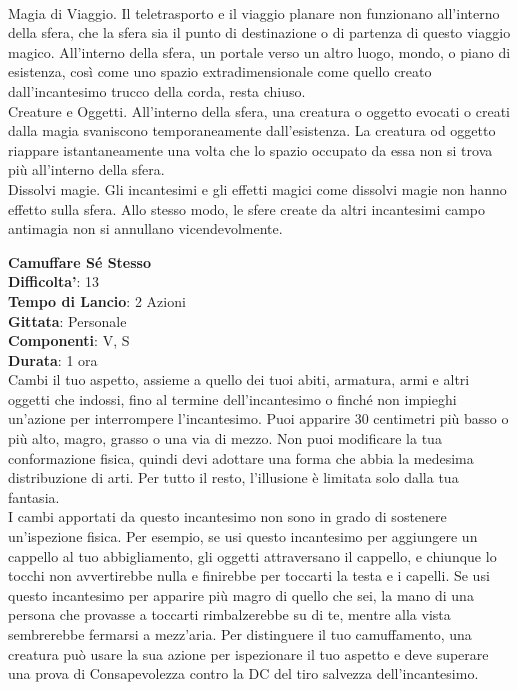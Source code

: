 \begin{multicols}{2}
\\Magia di Viaggio. Il teletrasporto e il viaggio planare non funzionano all’interno della sfera, che la sfera sia il punto di destinazione o di partenza di questo viaggio magico. All’interno della sfera, un portale verso un altro luogo, mondo, o piano di esistenza, così come uno spazio extradimensionale come quello creato dall’incantesimo trucco della corda, resta chiuso.
\\Creature e Oggetti. All’interno della sfera, una creatura o oggetto evocati o creati dalla magia svaniscono temporaneamente dall’esistenza. La creatura od oggetto riappare istantaneamente una volta che lo spazio occupato da essa non si trova più all’interno della sfera.
\\Dissolvi magie. Gli incantesimi e gli effetti magici come dissolvi magie non hanno effetto sulla sfera. Allo stesso modo, le sfere create da altri incantesimi campo antimagia non si annullano vicendevolmente. 

\medskip\textbf{Camuffare Sé Stesso}\\
\textbf{Difficolta'}: 13\\
\textbf{Tempo di Lancio}: 2 Azioni\\
\textbf{Gittata}: Personale\\
\textbf{Componenti}: V, S\\
\textbf{Durata}: 1 ora\\
Cambi il tuo aspetto, assieme a quello dei tuoi abiti, armatura, armi e altri oggetti che indossi, fino al termine dell’incantesimo o finché non impieghi un’azione per interrompere l’incantesimo. Puoi apparire 30 centimetri più basso o più alto, magro, grasso o una via di mezzo. Non puoi modificare la tua conformazione fisica, quindi devi adottare una forma che abbia la medesima distribuzione di arti. Per tutto il resto, l’illusione è limitata solo dalla tua fantasia.\\
I cambi apportati da questo incantesimo non sono in grado di sostenere un’ispezione fisica. Per esempio, se usi questo incantesimo per aggiungere un cappello al tuo abbigliamento, gli oggetti attraversano il cappello, e chiunque lo tocchi non avvertirebbe nulla e finirebbe per toccarti la testa e i capelli. Se usi questo incantesimo per apparire più magro di quello che sei, la mano di una persona che provasse a toccarti rimbalzerebbe su di te, mentre alla vista sembrerebbe fermarsi a mezz’aria. Per distinguere il tuo camuffamento, una creatura può usare la sua azione per ispezionare il tuo aspetto e deve superare una prova di Consapevolezza contro la DC del tiro salvezza dell’incantesimo. 


\end{multicols}
